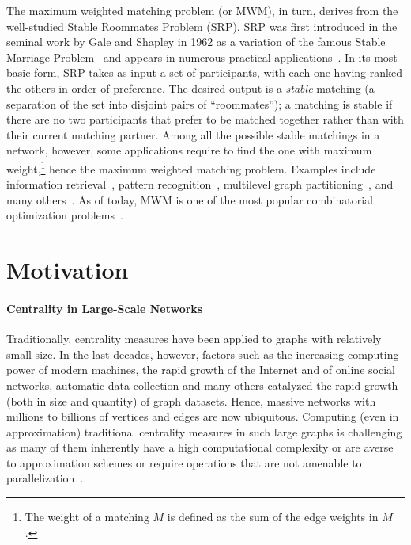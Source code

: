The maximum weighted matching problem (or MWM), in turn, derives from the
well-studied Stable Roommates Problem (SRP). SRP was first introduced in the
seminal work by Gale and Shapley in 1962 as a variation of the famous Stable
Marriage Problem~\cite{DBLP:journals/tamm/GaleS13} and appears in numerous
practical applications~\cite{iwama2007stable}.
In its most basic form, SRP takes as input a set of participants, with each one
having ranked the others in order of preference.
The desired output is a \emph{stable} matching (\ie a separation of the set into
disjoint pairs of \enquote{roommates}); a matching is stable if
there are no two participants that prefer to be matched
together rather than with their current matching partner.
Among all the possible stable matchings in a network, however, some
applications require to find the one with maximum weight,\footnote{The weight
of a matching $M$ is defined as the sum of the edge weights in $M$.}
hence the maximum weighted matching problem.
Examples include information retrieval~\cite{DBLP:conf/ecir/LaitangPB13},
pattern recognition~\cite{DBLP:journals/ijprai/ConteFSV04},
multilevel graph partitioning~\cite{DBLP:journals/pc/MonienPD00}, and many
others~\cite{wang2004bipartite,DBLP:conf/ismb/BorgwardtOSVSK05,
DBLP:journals/dc/HalldorssonKPR18,DBLP:journals/jpdc/Patt-ShamirRS12}.
As of today, MWM is one of the most popular combinatorial optimization
problems~\cite{DBLP:journals/networks/Johnson94,DBLP:journals/eatcs/Manlove14,
bisseling2020parallel}.


\section{Motivation}
\label{sec:intro:motivation}
%
\paragraph{Centrality in Large-Scale Networks}
%
Traditionally, centrality measures have been applied to graphs
with relatively small size.
In the last decades, however, factors such as the increasing computing power of
modern machines, the rapid growth of the Internet and of
online social networks, automatic data collection and many others catalyzed
the rapid growth (both in size and quantity) of graph datasets.
Hence, massive networks with millions to billions of vertices and edges are now
ubiquitous.
Computing (even in approximation) traditional centrality measures in such large
graphs is challenging as many of them inherently have a high computational
complexity or are averse to approximation schemes or require operations that
are not amenable to
parallelization~\cite{DBLP:conf/sdm/KangPST11}.

